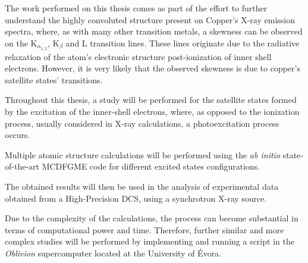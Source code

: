 
%

The work performed on this thesis comes as part of the effort to further understand the highly convoluted structure present on Copper's X-ray emission spectra, where, as with many other transition metals, a skewness can be observed on the K$_{\alpha_{1,2}}$, K$_{\beta}$ and L transition lines. These lines originate due to the radiative relaxation of the atom's electronic structure post-ionization of inner shell electrons.
However, it is very likely that the observed skewness is due to copper's satellite states' transitions.

Throughout this thesis, a study will be performed for the satellite states formed by the excitation of the inner-shell electrons, where, as opposed to the ionization process, usually considered in X-ray calculations, a photoexcitation process occurs.

 Multiple atomic structure calculations will be performed using the \textit{ab initio} state-of-the-art \gls{MCDFGME} code for different excited states configurations.

 The obtained results will then be used in the analysis of experimental data obtained from a High-Precision \gls{DCS}, using a synchrotron X-ray source.

Due to the complexity of the calculations, the process can become substantial in terms of computational power and time. Therefore, further similar and more complex studies will be performed by implementing and running a script in the \textit{Oblivion} supercomputer located at the University of Évora.

